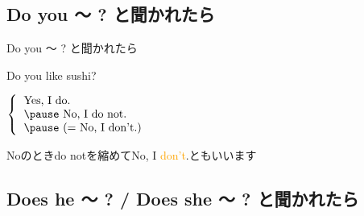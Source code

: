 \documentclass[aspectratio=169]{beamer}
\newcommand{\myaudio}[1]{\href{#1}{\faVolumeUp}}
\begin{document}
\subsection{Do you 〜 ? と聞かれたら}
 \begin{frame}[plain]{Do you 〜 ? と聞かれたら}
 \Large
\pause

Do you like sushi?\hfill{}

\vspace{20pt}
\pause

\mbox{}\hspace{100pt}$\left\{\begin{tabular}{l}
         \text{Yes, I do.}\\\pause
         \text{No, I do not.}\\\pause
         \text{(}= \text{No, I don't.)}
        \end{tabular}\right.$

\pause

\mbox{}\hfill{}{\small Noのときdo notを縮めてNo, I \textcolor{orange}{don't}.ともいいます}

\pause
\mbox{}\hfill\myaudio{./audio/011_answer_do_01.mp3}
\end{frame}

\subsection{Does he 〜 ?  / Does she 〜 ? と聞かれたら}
\end{document}
